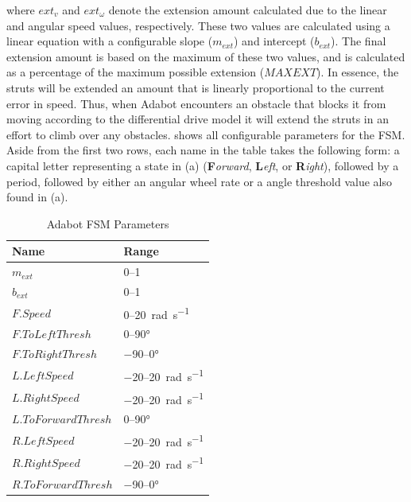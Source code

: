 \noindent
where $\mathit{ext}_v$ and $\mathit{ext}_\omega$ denote the extension amount calculated due to the linear and angular speed values, respectively. These two values are calculated using a linear equation with a configurable slope ($m_{\mathit{ext}}$) and intercept ($b_{\mathit{ext}}$).
%
The final extension amount is based on the maximum of these two values, and is calculated as a percentage of the maximum possible extension ($\mathit{MAXEXT}$).
%
In essence, the struts will be extended an amount that is linearly proportional to the current error in speed.
%
Thus, when Adabot encounters an obstacle that blocks it from moving according to the differential drive model it will extend the struts in an effort to climb over any obstacles.
%
 shows all configurable parameters for the FSM. Aside from the first two rows, each name in the table takes the following form: a capital letter representing a state in (a) (\textbf{F}\emph{orward}, \textbf{L}\emph{eft}, or \textbf{R}\emph{ight}), followed by a period, followed by either an angular wheel rate or a angle threshold value also found in (a).

\begin{table}[hb]
    \centering
    \caption{Adabot FSM Parameters}
    \label{tbl:params-fsm}
    \begin{tabular}{@{}ll@{}}
        \toprule
        \textbf{Name} & \textbf{Range}\\
        \midrule
        $m_{\mathit{ext}}$ & \numrange{0}{1}\\
        $b_{\mathit{ext}}$ & \numrange{0}{1}\\
        $F.Speed$ & \numrange{0}{20}~\si{\radian\per\second} \\
        $F.ToLeftThresh$ & \numrange{0}{90}\si{\degree}\\
        $F.ToRightThresh$ & \numrange{-90}{0}\si{\degree}\\
        $L.LeftSpeed$ & \numrange{-20}{20}~\si{\radian\per\second} \\
        $L.RightSpeed$ & \numrange{-20}{20}~\si{\radian\per\second} \\
        $L.ToForwardThresh$ & \numrange{0}{90}\si{\degree}\\
        $R.LeftSpeed$ & \numrange{-20}{20}~\si{\radian\per\second} \\
        $R.RightSpeed$ & \numrange{-20}{20}~\si{\radian\per\second} \\
        $R.ToForwardThresh$ & \numrange{-90}{0}\si{\degree}\\
        \bottomrule
    \end{tabular}
\end{table}


